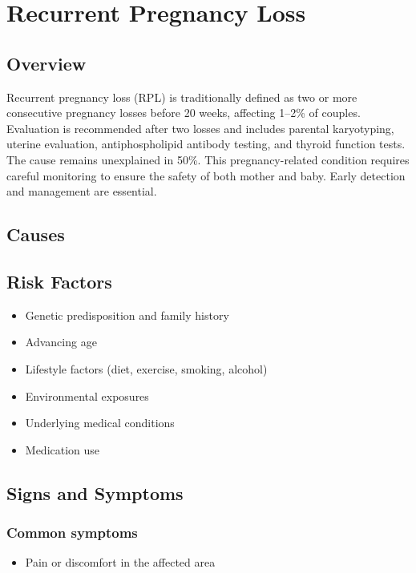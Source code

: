 \chapter{Recurrent Pregnancy Loss}
\label{sec:Recurrent Pregnancy Loss}

\section{Overview}
Recurrent pregnancy loss (RPL) is traditionally defined as two or more consecutive pregnancy losses before 20 weeks, affecting 1--2\% of couples. Evaluation is recommended after two losses and includes parental karyotyping, uterine evaluation, antiphospholipid antibody testing, and thyroid function tests. The cause remains unexplained in 50\%. This pregnancy-related condition requires careful monitoring to ensure the safety of both mother and baby. Early detection and management are essential.
\section{Causes}
\section{Risk Factors}

\begin{itemize}[noitemsep]
  \item Genetic predisposition and family history
  \item Advancing age
  \item Lifestyle factors (diet, exercise, smoking, alcohol)
  \item Environmental exposures
  \item Underlying medical conditions
  \item Medication use
\end{itemize}
\section{Signs and Symptoms}

\subsection{Common symptoms}
\begin{itemize}[noitemsep]
  \item Pain or discomfort in the affected area
  \end{itemize}

